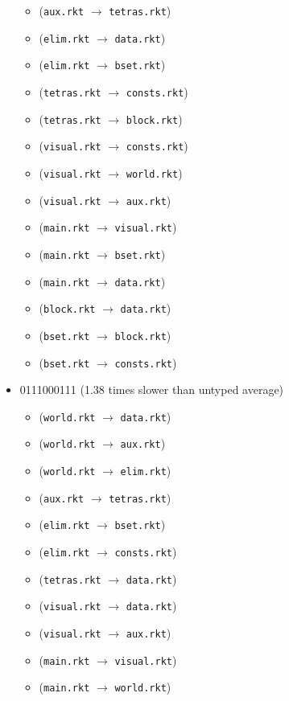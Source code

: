 \documentclass{article}
\newcommand{\mono}[1]{\texttt{#1}}
\begin{document}
\begin{itemize}
\begin{itemize}
  \item (\mono{aux.rkt} $\rightarrow$ \mono{tetras.rkt})
  \item (\mono{elim.rkt} $\rightarrow$ \mono{data.rkt})
  \item (\mono{elim.rkt} $\rightarrow$ \mono{bset.rkt})
  \item (\mono{tetras.rkt} $\rightarrow$ \mono{consts.rkt})
  \item (\mono{tetras.rkt} $\rightarrow$ \mono{block.rkt})
  \item (\mono{visual.rkt} $\rightarrow$ \mono{consts.rkt})
  \item (\mono{visual.rkt} $\rightarrow$ \mono{world.rkt})
  \item (\mono{visual.rkt} $\rightarrow$ \mono{aux.rkt})
  \item (\mono{main.rkt} $\rightarrow$ \mono{visual.rkt})
  \item (\mono{main.rkt} $\rightarrow$ \mono{bset.rkt})
  \item (\mono{main.rkt} $\rightarrow$ \mono{data.rkt})
  \item (\mono{block.rkt} $\rightarrow$ \mono{data.rkt})
  \item (\mono{bset.rkt} $\rightarrow$ \mono{block.rkt})
  \item (\mono{bset.rkt} $\rightarrow$ \mono{consts.rkt})
  \end{itemize}
\item 0111000111 (1.38 times slower than untyped average)
  \begin{itemize}
  \item (\mono{world.rkt} $\rightarrow$ \mono{data.rkt})
  \item (\mono{world.rkt} $\rightarrow$ \mono{aux.rkt})
  \item (\mono{world.rkt} $\rightarrow$ \mono{elim.rkt})
  \item (\mono{aux.rkt} $\rightarrow$ \mono{tetras.rkt})
  \item (\mono{elim.rkt} $\rightarrow$ \mono{bset.rkt})
  \item (\mono{elim.rkt} $\rightarrow$ \mono{consts.rkt})
  \item (\mono{tetras.rkt} $\rightarrow$ \mono{data.rkt})
  \item (\mono{visual.rkt} $\rightarrow$ \mono{data.rkt})
  \item (\mono{visual.rkt} $\rightarrow$ \mono{aux.rkt})
  \item (\mono{main.rkt} $\rightarrow$ \mono{visual.rkt})
  \item (\mono{main.rkt} $\rightarrow$ \mono{world.rkt})

\end{itemize}
\end{itemize}
\end{document}
